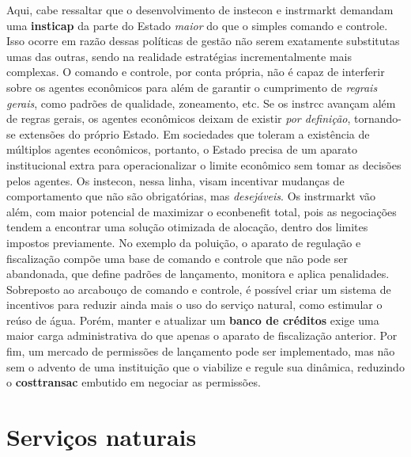 \documentclass[./main.tex]{subfiles}
\begin{document}
\par Aqui, cabe ressaltar que o desenvolvimento de \gls{instecon} e \gls{instrmarkt} demandam uma \textbf{\gls{insticap}} da parte do Estado \textit{maior} do que o simples comando e controle. Isso ocorre em razão dessas políticas de gestão não serem exatamente substitutas umas das outras, sendo na realidade estratégias incrementalmente mais complexas. O comando e controle, por conta própria, não é capaz de interferir sobre os agentes econômicos para além de garantir o cumprimento de \textit{regrais gerais}, como padrões de qualidade, zoneamento, etc. Se os \gls{instrcc} avançam além de regras gerais, os agentes econômicos deixam de existir \textit{por definição}, tornando-se extensões do próprio Estado. Em sociedades que toleram a existência de múltiplos agentes econômicos, portanto, o Estado precisa de um aparato institucional extra para operacionalizar o limite econômico sem tomar as decisões pelos agentes. Os \gls{instecon}, nessa linha, visam incentivar mudanças de comportamento que não são obrigatórias, mas \textit{desejáveis}. Os \gls{instrmarkt} vão além, com maior potencial de maximizar o \gls{econbenefit} total, pois as negociações tendem a encontrar uma solução otimizada de alocação, dentro dos limites impostos previamente. No exemplo da poluição, o aparato de regulação e fiscalização compõe uma base de comando e controle que não pode ser abandonada, que define padrões de lançamento, monitora e aplica penalidades. Sobreposto ao arcabouço de comando e controle, é possível criar um sistema de incentivos para reduzir ainda mais o uso do serviço natural, como estimular o reúso de água. Porém, manter e atualizar um \textbf{banco de créditos} exige uma maior carga administrativa do que apenas o aparato de fiscalização anterior. Por fim, um mercado de permissões de lançamento pode ser implementado, mas não sem o advento de uma instituição que o viabilize e regule sua dinâmica, reduzindo o \textbf{\gls{costtransac}} embutido em negociar as permissões.

\section{Serviços naturais} \label{chap:ecoeco:natserv}
\end{document}
